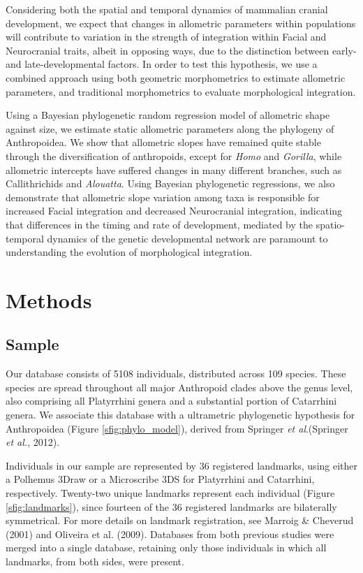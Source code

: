 \documentclass[11pt,twoside]{report}
\begin{document}
Considering both the spatial and temporal dynamics of mammalian cranial
development, we expect that changes in allometric parameters within
populations will contribute to variation in the strength of integration
within Facial and Neurocranial traits, albeit in opposing ways, due to
the distinction between early- and late-developmental factors. In order
to test this hypothesis, we use a combined approach using both geometric
morphometrics to estimate allometric parameters, and traditional
morphometrics to evaluate morphological integration.

Using a Bayesian phylogenetic random regression model of allometric
shape against size, we estimate static allometric parameters along the
phylogeny of Anthropoidea. We show that allometric slopes have remained
quite stable through the diversification of anthropoids, except for
\emph{Homo} and \emph{Gorilla}, while allometric intercepts have
suffered changes in many different branches, such as Callithrichids and
\emph{Alouatta}. Using Bayesian phylogenetic regressions, we also
demonstrate that allometric slope variation among taxa is responsible
for increased Facial integration and decreased Neurocranial integration,
indicating that differences in the timing and rate of development,
mediated by the spatio-temporal dynamics of the genetic developmental
network are paramount to understanding the evolution of morphological
integration.

\section{Methods}\label{methods-1}

\subsection{Sample}\label{sample-1}

Our database consists of 5108 individuals, distributed across 109
species. These species are spread throughout all major Anthropoid clades
above the genus level, also comprising all Platyrrhini genera and a
substantial portion of Catarrhini genera. We associate this database
with a ultrametric phylogenetic hypothesis for Anthropoidea (Figure
\ref{sfig:phylo_model}), derived from Springer \emph{et al}.(Springer
\emph{et al.}, 2012).

Individuals in our sample are represented by 36 registered landmarks,
using either a Polhemus 3Draw or a Microscribe 3DS for Platyrrhini and
Catarrhini, respectively. Twenty-two unique landmarks represent each
individual (Figure \ref{sfig:landmarks}), since fourteen of the 36
registered landmarks are bilaterally symmetrical. For more details on
landmark registration, see Marroig \& Cheverud (2001) and Oliveira et
al. (2009). Databases from both previous studies were merged into a
single database, retaining only those individuals in which all
landmarks, from both sides, were present.
\end{document}
